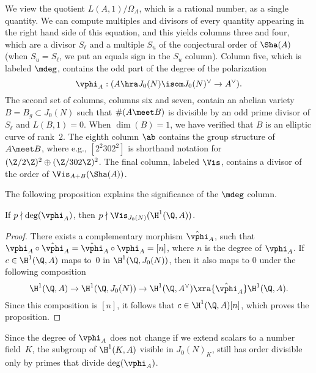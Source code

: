 \documentclass{report}
\begin{document}
We view the quotient $L(A,1)/\Omega_A$, which is a rational number, as
a single quantity.  We can compute multiples and divisors of every
quantity appearing in the right hand side of this equation, and this
yields columns three and four, which are a divisor $S_\ell$ and a
multiple $S_u$ of the conjectural order of $\Sha(A)$ (when
$S_u=S_\ell$, we put an equals sign in the $S_u$ column).  Column
five, which is labeled $\mdeg$, contains the odd part of the degree of
the polarization
\begin{equation}\label{eqn:vphi}
 \vphi_A : (A \hra J_0(N) \isom J_0(N)^{\vee} \to A^{\vee}).
\end{equation}
The second set of columns, columns six and seven, contain an abelian
variety $B=B_g\subset J_0(N)$ such that $\#(A\meet B)$ is divisible by
an odd prime divisor of $S_\ell$ and $L(B,1)=0$. When $\dim(B)=1$, we
have verified that $B$ is an elliptic curve of rank~$2$.  The eighth
column $\ab$ contains the group structure of $A\meet B$, where e.g.,
$[2^2 302^2]$ is shorthand notation for $(\Z/2\Z)^2 \oplus
(\Z/302\Z)^2$.  The final column, labeled $\Vis$, contains a divisor
of the order of $\Vis_{A+B}(\Sha(A))$.

The following proposition explains the significance of the $\mdeg$ column.
\begin{proposition}
If $p\nmid \deg(\vphi_A)$, then $p\nmid \Vis_{J_0(N)}(\H^1(\Q,A))$.
\end{proposition}
\begin{proof}
There exists a complementary morphism $\hat{\vphi}_A$, such that
$\vphi_A\circ \hat{\vphi}_A = \hat{\vphi}_A\circ \vphi_A = [n]$,
where $n$ is the degree of $\vphi_A$.  If $c\in\H^1(\Q,A)$ maps to~$0$
in $\H^1(\Q,J_0(N))$, then it also maps to $0$ under
the following composition
$$
\H^1(\Q,A) \to \H^1(\Q,J_0(N)) \to  \H^1(\Q,A^{\vee}) \xra{\hat{\vphi}_A} \H^1(\Q,A).
$$
Since this composition is $[n]$, it follows that
$c\in\H^1(\Q,A)[n]$, which proves the proposition.
\end{proof}

\begin{remark}
Since the degree of $\vphi_A$ does not change if we extend scalars to
a number field~$K$, the subgroup of $\H^1(K,A)$ visible in $J_0(N)_K$,
still has order divisible only by primes that divide $\deg(\vphi_A)$.
\end{remark}
\end{document}
